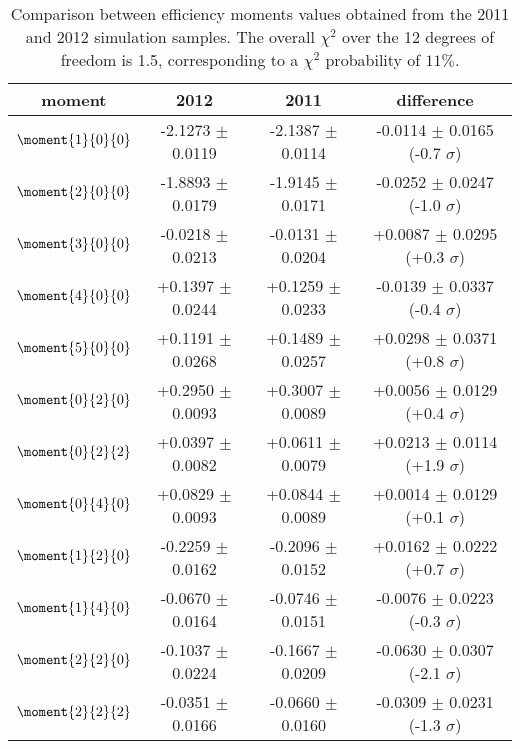 
\begin{table}
\centering
\footnotesize
\begin{tabular}{c c c c}
  \hline
        moment         &  2012    &    2011  &   difference                        \\
  \hline
  $\moment{1}{0}{0}$   & -2.1273 $\pm$  0.0119  &  -2.1387 $\pm$  0.0114  &  -0.0114 $\pm$  0.0165 (-0.7 $\sigma$) \\
  $\moment{2}{0}{0}$   & -1.8893 $\pm$  0.0179  &  -1.9145 $\pm$  0.0171  &  -0.0252 $\pm$  0.0247 (-1.0 $\sigma$) \\
  $\moment{3}{0}{0}$   & -0.0218 $\pm$  0.0213  &  -0.0131 $\pm$  0.0204  &  +0.0087 $\pm$  0.0295 (+0.3 $\sigma$) \\
  $\moment{4}{0}{0}$   & +0.1397 $\pm$  0.0244  &  +0.1259 $\pm$  0.0233  &  -0.0139 $\pm$  0.0337 (-0.4 $\sigma$) \\
  $\moment{5}{0}{0}$   & +0.1191 $\pm$  0.0268  &  +0.1489 $\pm$  0.0257  &  +0.0298 $\pm$  0.0371 (+0.8 $\sigma$) \\
  $\moment{0}{2}{0}$   & +0.2950 $\pm$  0.0093  &  +0.3007 $\pm$  0.0089  &  +0.0056 $\pm$  0.0129 (+0.4 $\sigma$) \\
  $\moment{0}{2}{2}$   & +0.0397 $\pm$  0.0082  &  +0.0611 $\pm$  0.0079  &  +0.0213 $\pm$  0.0114 (+1.9 $\sigma$) \\
  $\moment{0}{4}{0}$   & +0.0829 $\pm$  0.0093  &  +0.0844 $\pm$  0.0089  &  +0.0014 $\pm$  0.0129 (+0.1 $\sigma$) \\
  $\moment{1}{2}{0}$   & -0.2259 $\pm$  0.0162  &  -0.2096 $\pm$  0.0152  &  +0.0162 $\pm$  0.0222 (+0.7 $\sigma$) \\
  $\moment{1}{4}{0}$   & -0.0670 $\pm$  0.0164  &  -0.0746 $\pm$  0.0151  &  -0.0076 $\pm$  0.0223 (-0.3 $\sigma$) \\
  $\moment{2}{2}{0}$   & -0.1037 $\pm$  0.0224  &  -0.1667 $\pm$  0.0209  &  -0.0630 $\pm$  0.0307 (-2.1 $\sigma$) \\
  $\moment{2}{2}{2}$   & -0.0351 $\pm$  0.0166  &  -0.0660 $\pm$  0.0160  &  -0.0309 $\pm$  0.0231 (-1.3 $\sigma$) \\
  \hline
\end{tabular}
\caption{Comparison between efficiency moments values obtained from the 2011 and 2012 \BsbarJpsiKst simulation samples.
         The overall $\chi^2$ over the 12 degrees of freedom is 1.5, corresponding to a $\chi^2$ probability of $11\%$.}
\label{moms_comp_periods_pos}
\end{table}


